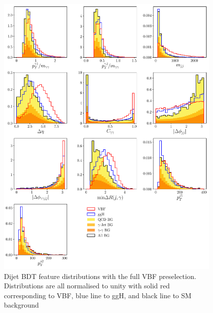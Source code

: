 \begin{figure}[h!]
    \includegraphics[width=0.98\textwidth]{figures/appendix_VBFLPS/dijet_BDT_features_splitBG_LPS.pdf}
    \caption{Dijet BDT feature distributions with the full VBF preselection. Distributions are all normalised to unity with solid red corresponding to VBF, blue line to ggH, and black line to SM background}
    \label{fig:vbf_lps_appendix:dijet_bdt_features}
\end{figure}

